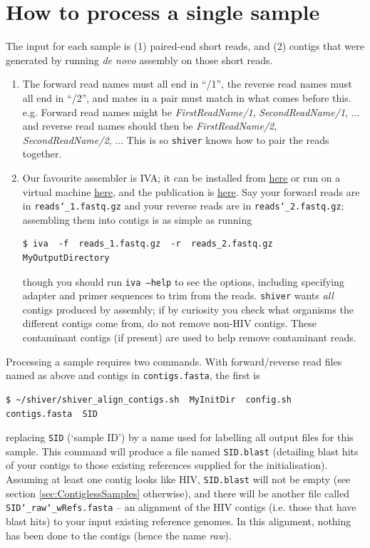 \documentclass{article}
\newcommand{\shiv}{\c{shiver}\xspace}
\let\c\texttt
\newcommand{\www}{\color{blue} \underline}
\begin{document}
\section{How to process a single sample} \label{sec:SingleSample}

The input for each sample is (1) paired-end short reads, and (2) contigs that were generated by running {\it de novo} assembly on those short reads.
\begin{enumerate}
\item The forward read names must all end in ``/1'', the reverse read names must all end in ``/2'', and mates in a pair must match in what comes before this.
e.g. Forward read names might be {\it FirstReadName/1}, {\it SecondReadName/1}, $\ldots$ and reverse read names should then be {\it FirstReadName/2}, {\it SecondReadName/2}, $\ldots$ This is so \shiv knows how to pair the reads together.
\item Our favourite assembler is IVA; it can be installed from \href{http://sanger-pathogens.github.io/iva/}{\www{here}} or run on a virtual machine \href{http://sanger-pathogens.github.io/pathogens-vm/}{\www{here}}, and the publication is \href{http://bioinformatics.oxfordjournals.org/content/early/2015/02/27/bioinformatics.btv120.abstract}{\www{here}}.
Say your forward reads are in \c{reads\char`_1.fastq.gz} and your reverse reads are in \c{reads\char`_2.fastq.gz}; assembling them into contigs is as simple as running
\begin{Verbatim}[samepage=true]
$ iva  -f  reads_1.fastq.gz  -r  reads_2.fastq.gz  MyOutputDirectory
\end{Verbatim}
though you should run \c{iva --help} to see the options, including specifying adapter and primer sequences to trim from the reads.
\shiv wants {\it all} contigs produced by assembly; if by curiosity you check what organisms the different contigs come from, do not remove non-HIV contigs.
These contaminant contigs (if present) are used to help remove contaminant reads.
\end{enumerate}

Processing a sample requires two commands.
With forward/reverse read files named as above and contigs in \c{contigs.fasta}, the first is  
\begin{Verbatim}[samepage=true]
$ ~/shiver/shiver_align_contigs.sh  MyInitDir  config.sh  contigs.fasta  SID
\end{Verbatim}
replacing \c{SID} (`sample ID') by a name used for labelling all output files for this sample.
This command will produce a file named \c{SID.blast} (detailing blast hits of your contigs to those existing references supplied for the initialisation).
Assuming at least one contig looks like HIV, \c{SID.blast} will not be empty (see section \ref{sec:ContiglessSamples} otherwise), and there will be another file called \c{SID\char`_raw\char`_wRefs.fasta} -- an alignment of the HIV contigs (i.e. those that have blast hits) to your input existing reference genomes.
In this alignment, nothing has been done to the contigs (hence the name {\it raw}).
\end{document}

